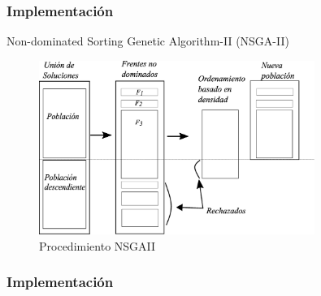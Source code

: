 \documentclass[9pt]{beamer}
\begin{document}


    \begin{frame}
        \frametitle{Implementación}                       
        Non-dominated Sorting Genetic Algorithm-II (NSGA-II)

        \begin{figure}
            \includegraphics[width=0.8\textwidth]{assets/NSGAII.eps}
            \caption{Procedimiento NSGAII~\citet{Deb2002}}
        \end{figure}

    \end{frame}
    \begin{frame}
        \frametitle{Implementación}
        \vspace{-16pt}
    \end{frame}
    
\end{document}
